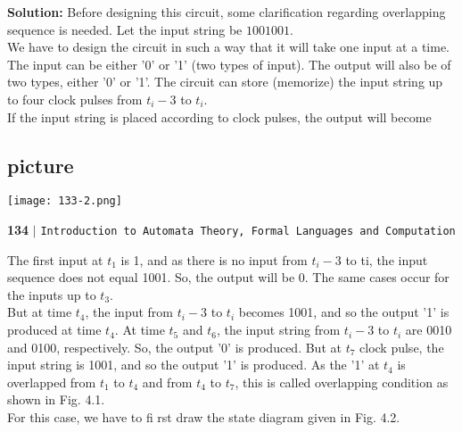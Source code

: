 \documentclass{article}
\begin{document}
\vspace*{0.5cm}
\textbf{Solution:} Before designing this circuit, some clarification regarding overlapping sequence is needed.
Let the input string be $1001001$.\\
\hspace*{0.5cm} We have to design the circuit in such a way that it will take one input at a time. The input can be either
'0' or '1' (two types of input). The output will also be of two types, either '0' or '1'. The circuit can store
(memorize) the input string up to four clock pulses from $t_i-3$ to $t_i$.\\
\hspace*{0.5cm} If the input string is placed according to clock pulses, the output will become\\

\begin{center}
\section{picture}
\texttt{[image: 133-2.png]}
\end{center}

\newpage
\begin{flushleft}
    \textbf{134}\hspace*{0.1cm} \textbf{$|$} \hspace*{0.1cm} \texttt{Introduction to Automata Theory, Formal Languages and Computation}
  \end{flushleft}

  \vspace*{0.5cm}
\hspace*{0.5cm} The first input at $t_1$ is 1, and as there is no input from $t_i-3$ to ti, the input sequence does not equal 1001.
So, the output will be 0. The same cases occur for the inputs up to $t_3$.\\
\hspace*{0.5cm} But at time $t_4$, the input from $t_i-3$ to $t_i$ becomes 1001, and so the output '1' is produced at time $t_4$. At
time $t_5$ and $t_6$, the input string from $t_i-3$ to $t_i$ are 0010 and 0100, respectively. So, the output '0' is produced.
But at $t_7$ clock pulse, the input string is 1001, and so the output '1' is produced. As the '1' at $t_4$ is
overlapped from $t_1$ to $t_4$ and from $t_4$ to $t_7$, this is called overlapping condition as shown in Fig. 4.1.\\

\hspace*{0.5cm} For this case, we have to fi rst draw the state diagram given in Fig. 4.2.\\
\end{document}
